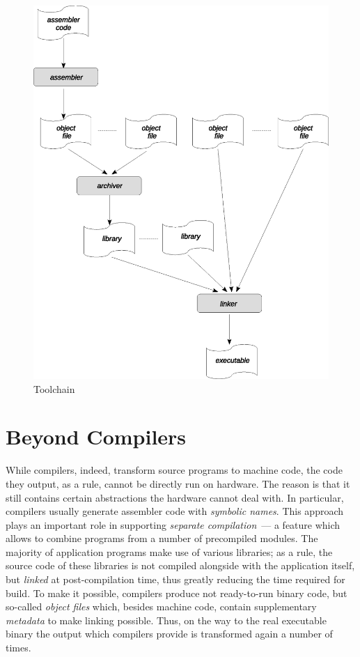 \documentclass{book}
\begin{document}
\begin{figure}[t]
  \centering
  \includegraphics[scale=0.7]{images/01-09.eps}
  \caption{Toolchain}
  \label{toolchain}
\end{figure}

\section{Beyond Compilers}

While compilers, indeed, transform source programs to machine code, the code they output, as a rule, cannot be directly run on hardware.
The reason is that it still contains certain abstractions the hardware cannot deal with. In particular, compilers usually generate
assembler code with \emph{symbolic names}. This approach plays an important role in supporting \emph{separate compilation}~--- a
feature which allows to combine programs from a number of precompiled modules. The majority of application programs
make use of various libraries; as a rule, the source code of these libraries is not compiled alongside with the application itself, but
\emph{linked} at post-compilation time, thus greatly reducing the time required for build. To make it possible, compilers
produce not ready-to-run binary code, but so-called \emph{object files} which, besides machine code, contain supplementary
\emph{metadata} to make linking possible. Thus, on the way to the real executable binary the output which compilers provide
is transformed again a number of times.
\end{document}
